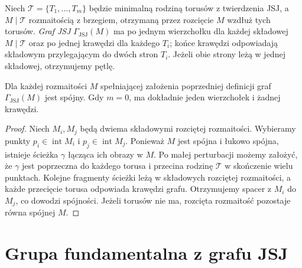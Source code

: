 \begin{definicja}
Niech $\mathcal T=\{T_1,\ldots,T_m\}$ będzie
minimalną rodziną torusów z twierdzenia JSJ,
a $M\mid\mathcal T$ rozmaitością z brzegiem,
otrzymaną przez rozcięcie $M$ wzdłuż tych torusów.
\emph{Graf JSJ} $\Gamma_{\mathrm{JSJ}}(M)$ ma po jednym
wierzchołku dla każdej składowej $M\mid\mathcal T$
oraz po jednej krawędzi dla każdego $T_i$;
końce krawędzi odpowiadają składowym przylegającym
do dwóch stron $T_i$. Jeżeli obie strony leżą
w jednej składowej, otrzymujemy pętlę.
\end{definicja}

\begin{stwierdzenie}
Dla każdej rozmaitości $M$ spełniającej założenia
poprzedniej definicji graf $\Gamma_{\mathrm{JSJ}}(M)$
jest spójny. Gdy $m=0$, ma dokładnie jeden
wierzchołek i żadnej krawędzi.
\end{stwierdzenie}
\begin{proof}
Niech $M_i,M_j$ będą dwiema składowymi rozciętej
rozmaitości. Wybieramy punkty $p_i\in\operatorname{int}M_i$
i $p_j\in\operatorname{int}M_j$. Ponieważ $M$ jest
spójna i łukowo spójna, istnieje ścieżka $\gamma$
łącząca ich obrazy w $M$. Po małej perturbacji
możemy założyć, że $\gamma$ jest poprzeczna do
każdego torusa i przecina rodzinę $\mathcal T$
w skończenie wielu punktach. Kolejne fragmenty
ścieżki leżą w składowych rozciętej rozmaitości,
a każde przecięcie torusa odpowiada krawędzi grafu.
Otrzymujemy spacer z $M_i$ do $M_j$, co dowodzi
spójności. Jeżeli torusów nie ma, rozcięta
rozmaitość pozostaje równa spójnej $M$.
\end{proof}

\begin{center}
\end{center}

\section{Grupa fundamentalna z grafu JSJ}
\label{sec:tg-jsj-groups}

